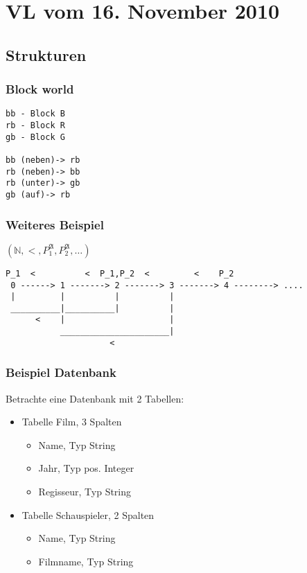 \section{VL vom 16. November 2010}

\subsection{Strukturen}
\subsubsection{Block world}

\begin{verbatim}
bb - Block B
rb - Block R
gb - Block G

bb (neben)-> rb
rb (neben)-> bb
rb (unter)-> gb
gb (auf)-> rb
\end{verbatim}

\subsubsection{Weiteres Beispiel}
$(\mathbb{N}, <, P_1^{\mathfrak{A}}, P_2^{\mathfrak{A}}, \dots)$
\begin{verbatim}
P_1  <          <  P_1,P_2  <         <    P_2
 0 ------> 1 -------> 2 -------> 3 -------> 4 --------> ....
 |         |          |          |
 __________|__________|          |
      <    |                     |
           ______________________|
                     <
\end{verbatim}

\subsubsection{Beispiel Datenbank}
Betrachte eine Datenbank mit 2 Tabellen:
\begin{itemize}
\item Tabelle Film, 3 Spalten
\begin{itemize}
\item Name, Typ String
\item Jahr, Typ pos. Integer
\item Regisseur, Typ String
\end{itemize}
\item Tabelle Schauspieler, 2 Spalten
\begin{itemize}
\item Name, Typ String
\item Filmname, Typ String
\end{itemize}
\end{itemize}

